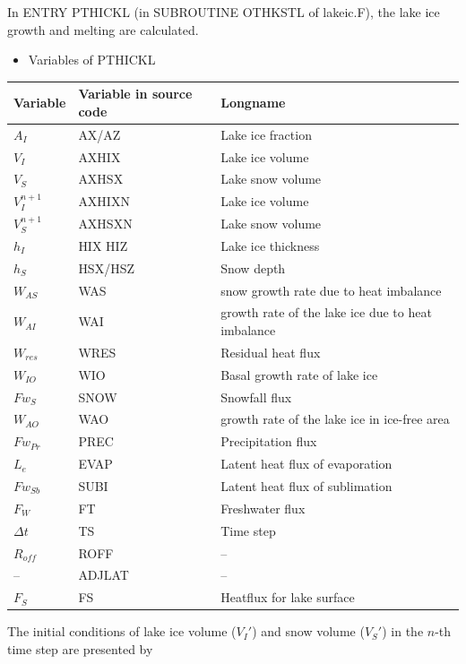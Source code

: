 In ENTRY PTHICKL (in SUBROUTINE OTHKSTL of lakeic.F), the lake ice growth and melting are calculated.

\begin{itemize}
\tightlist
\item
  Variables of PTHICKL
\end{itemize}

\begin{longtable}[]{@{}lll@{}}
\toprule\noalign{}
Variable & Variable in source code & Longname \\
\midrule\noalign{}
\endhead
\bottomrule\noalign{}
\endlastfoot
\(A_I\) & AX/AZ & Lake ice fraction \\
\(V_I\) & AXHIX & Lake ice volume \\
\(V_S\) & AXHSX & Lake snow volume \\
\(V_I^{n+1}\) & AXHIXN & Lake ice volume \\
\(V_S^{n+1}\) & AXHSXN & Lake snow volume \\
\(h_I\) & HIX HIZ & Lake ice thickness \\
\(h_S\) & HSX/HSZ & Snow depth \\
\(W_{AS}\) & WAS & snow growth rate due to heat imbalance \\
\(W_{AI}\) & WAI & growth rate of the lake ice due to heat imbalance \\
\(W_{res}\) & WRES & Residual heat flux \\
\(W_{IO}\) & WIO & Basal growth rate of lake ice \\
\(Fw_S\) & SNOW & Snowfall flux \\
\(W_{AO}\) & WAO & growth rate of the lake ice in ice-free area \\
\(Fw_{Pr}\) & PREC & Precipitation flux \\
\(L_e\) & EVAP & Latent heat flux of evaporation \\
\(Fw_{Sb}\) & SUBI & Latent heat flux of sublimation \\
\(F_W\) & FT & Freshwater flux \\
\(\Delta t\) & TS & Time step \\
\(R_{off}\) & ROFF & -- \\
-- & ADJLAT & -- \\
\(F_S\) & FS & Heatflux for lake surface \\
\end{longtable}

The initial conditions of lake ice volume (\(V_I'\)) and snow volume (\(V_S'\)) in the \(n\)-th time step are presented by

